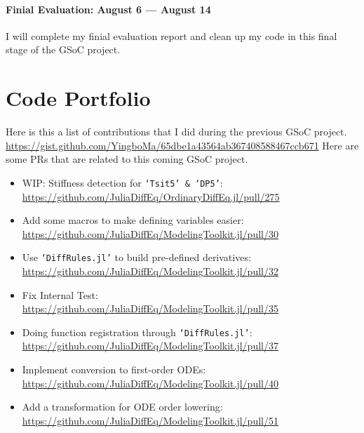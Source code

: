 \documentclass[12pt,a4paper]{article}
\begin{document}
\paragraph{Finial Evaluation: August 6 --- August 14}
I will complete my finial evaluation report and clean up my code in this final
stage of the GSoC project.

\section{Code Portfolio}
Here is this a list of contributions that I did during the previous GSoC
project. \url{https://gist.github.com/YingboMa/65dbe1a43564ab367408588467ccb671}
Here are some PRs that are related to this coming GSoC project.
\begin{itemize}
  \item WIP: Stiffness detection for \texttt{`Tsit5' \& `DP5'}: \\
    \url{https://github.com/JuliaDiffEq/OrdinaryDiffEq.jl/pull/275}

  \item Add some macros to make defining variables easier: \\
    \url{https://github.com/JuliaDiffEq/ModelingToolkit.jl/pull/30}

  \item Use \texttt{`DiffRules.jl'} to build pre-defined derivatives: \\
    \url{https://github.com/JuliaDiffEq/ModelingToolkit.jl/pull/32}

  \item Fix Internal Test: \\
    \url{https://github.com/JuliaDiffEq/ModelingToolkit.jl/pull/35}

  \item Doing function registration through \texttt{`DiffRules.jl'}: \\
    \url{https://github.com/JuliaDiffEq/ModelingToolkit.jl/pull/37}

  \item Implement conversion to first-order ODEs: \\
    \url{https://github.com/JuliaDiffEq/ModelingToolkit.jl/pull/40}

  \item Add a transformation for ODE order lowering: \\
    \url{https://github.com/JuliaDiffEq/ModelingToolkit.jl/pull/51}
\end{itemize}
\end{document}
